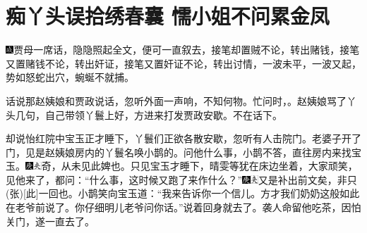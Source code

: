 \chapter{痴丫头误拾绣春囊 懦小姐不问累金凤}
{\includegraphics[width=3mm]{../Images/00005}\kaishu 贾母一席话，隐隐照起全文，便可一直叙去，接笔却置贼不论，转出赌钱，接笔又置赌钱不论，转出奸证，接笔又置奸证不论，转出讨情，一波未平，一波又起，势如怒蛇出穴，蜿蜒不就捕。}

话说那赵姨娘和贾政说话，忽听外面一声响，不知何物。忙问时，。赵姨娘骂了丫头几句，自己带领丫鬟上好，方进来打发贾政安歇。不在话下。

却说怡红院中宝玉正才睡下，丫鬟们正欲各散安歇，忽听有人击院门。老婆子开了门，见是赵姨娘房内的丫鬟名唤小鹊的。问他什么事，小鹊不答，直往房内来找宝玉。{\includegraphics[width=3mm]{../Images/00004}\includegraphics[width=3mm]{../Images/00012}\footnotesize \kaishu 奇，从未见此婢也。}只见宝玉才睡下，晴雯等犹在床边坐着，大家顽笑，见他来了，都问：``什么事，这时候又跑了来作什么？''{\includegraphics[width=3mm]{../Images/00004}\includegraphics[width=3mm]{../Images/00012}\footnotesize \kaishu 又是补出前文矣，非只{(张)}{[}此{]}一回也。}小鹊笑向宝玉道：``我来告诉你一个信儿。方才我们奶奶这般如此在老爷前说了。你仔细明儿老爷问你话。''说着回身就去了。袭人命留他吃茶，因怕关门，遂一直去了。

